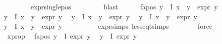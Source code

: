 \begin{isabellebody}
\ \ \ \ \ \ \isamarkupfalse%
\ expr{\isacharunderscore}{\kern0pt}single{\isacharunderscore}{\kern0pt}pos\ \isanewline
\ \ \ \ \ \ \isamarkupfalse%
\ blast\isanewline
\ \ \ \ \isamarkupfalse%
\ fa{\isacharunderscore}{\kern0pt}pos{\isacharcolon}{\kern0pt}\ {\isachardoublequoteopen}{\isasymforall}y{\isasymin}{\isasymPhi}\ {\isacharbackquote}{\kern0pt}\ I{\isachardot}{\kern0pt}\ x\ {\isasymnoteq}\ y\ {\isasymlongrightarrow}\ expr{\isacharunderscore}{\kern0pt}{}\ y\ {\isasymle}\ {}{\isachardoublequoteclose}\isanewline
{\isachardoublequoteopen}{\isasymforall}y{\isasymin}{\isasymPhi}\ {\isacharbackquote}{\kern0pt}\ I{\isachardot}{\kern0pt}\ x\ {\isasymnoteq}\ y\ {\isasymlongrightarrow}\ expr{\isacharunderscore}{\kern0pt}{}\ y\ {\isasymle}\ {}{\isachardoublequoteclose}\isanewline
{\isachardoublequoteopen}{\isasymforall}y{\isasymin}{\isasymPhi}\ {\isacharbackquote}{\kern0pt}\ I{\isachardot}{\kern0pt}\ x\ {\isasymnoteq}\ y\ {\isasymlongrightarrow}\ expr{\isacharunderscore}{\kern0pt}{}\ y\ {\isasymle}\ {}{\isachardoublequoteclose}\isanewline
{\isachardoublequoteopen}{\isasymforall}y{\isasymin}{\isasymPhi}\ {\isacharbackquote}{\kern0pt}\ I{\isachardot}{\kern0pt}\ x\ {\isasymnoteq}\ y\ {\isasymlongrightarrow}\ expr{\isacharunderscore}{\kern0pt}{}\ y\ {\isasymle}\ {}{\isachardoublequoteclose}\isanewline
{\isachardoublequoteopen}{\isasymforall}y{\isasymin}{\isasymPhi}\ {\isacharbackquote}{\kern0pt}\ I{\isachardot}{\kern0pt}\ x\ {\isasymnoteq}\ y\ {\isasymlongrightarrow}\ expr{\isacharunderscore}{\kern0pt}{}\ y\ {\isasymle}\ {}{\isachardoublequoteclose}\isanewline
\ \ \ \ \ \ \isamarkupfalse%
\ expr{\isachardot}{\kern0pt}simps\ less{\isacharunderscore}{\kern0pt}eq{\isacharunderscore}{\kern0pt}t{\isachardot}{\kern0pt}simps\isanewline
\ \ \ \ \ \ \isamarkupfalse%
\ force{\isacharplus}{\kern0pt}\ \isanewline
\ \ \ \ \isamarkupfalse%
\ x{\isacharunderscore}{\kern0pt}prop\ \isamarkupfalse%
\ fa{\isacharunderscore}{\kern0pt}pos{\isacharcolon}{\kern0pt}\ {\isachardoublequoteopen}{\isasymforall}y{\isasymin}{\isasymPhi}\ {\isacharbackquote}{\kern0pt}\ I{\isachardot}{\kern0pt}\ expr{\isacharunderscore}{\kern0pt}{}\ y\ {\isasymle}\ {}{\isachardoublequoteclose}\isanewline
{\isachardoublequoteopen}{\isasymforall}y{\isasymin}{\isasymPhi}\ {\isacharbackquote}{\kern0pt}\ I{\isachardot}{\kern0pt}\ expr{\isacharunderscore}{\kern0pt}{}\ y\ {\isasymle}\ {}{\isachardoublequoteclose}\isanewline

\end{isabellebody}
